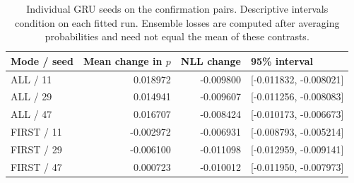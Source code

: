 \documentclass[11pt]{article}
\newcommand{\1}{\mathbb{I}}
\begin{document}
\begin{table}[htbp]
\centering
\caption{Individual GRU seeds on the confirmation pairs. Descriptive intervals condition on each fitted run. Ensemble losses are computed after averaging probabilities and need not equal the mean of these contrasts.}
\label{tab:gruseeds}
\begin{tabular}{lrrl}
\toprule
Mode / seed & Mean change in $p$ & NLL change & 95\% interval \\
\midrule
ALL / 11 & 0.018972 & -0.009800 & [-0.011832, -0.008021] \\
ALL / 29 & 0.014941 & -0.009607 & [-0.011256, -0.008083] \\
ALL / 47 & 0.016707 & -0.008424 & [-0.010173, -0.006673] \\
FIRST / 11 & -0.002972 & -0.006931 & [-0.008793, -0.005214] \\
FIRST / 29 & -0.006100 & -0.011098 & [-0.012959, -0.009141] \\
FIRST / 47 & 0.000723 & -0.010012 & [-0.011950, -0.007973] \\
\bottomrule
\end{tabular}
\end{table}
\end{document}
